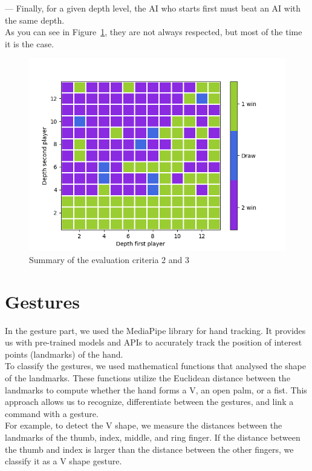 \documentclass[12pt, a4paper, oneside]{report}
\begin{document}
	— Finally, for a given depth level, the AI who starts first must beat an AI with the same depth. \\

	As you can see in Figure~\ref{fig:summary_criteria}, they are not always respected, but most of the time it is the case.
	\begin{figure}[h]
		\includegraphics[scale=1]{result_criteria.png}
		\centering
		\caption{Summary of the evaluation criteria 2 and 3}\label{fig:summary_criteria}
	\end{figure}

	\section{Gestures}
	In the gesture part, we used the MediaPipe library for hand tracking. It provides us with pre-trained models and APIs to accurately track the position of interest points (landmarks) of the hand. \\

	To classify the gestures, we used mathematical functions that analysed the shape of the landmarks. These functions utilize the Euclidean distance between the landmarks to compute whether the hand forms a V, an open palm, or a fist. This approach allows us to recognize, differentiate between the gestures, and link a command with a gesture. \\
	For example, to detect the V shape, we measure the distances between the landmarks of the thumb, index, middle, and ring finger. If the distance between the thumb and index is larger than the distance between the other fingers, we classify it as a V shape gesture. \\
\end{document}
